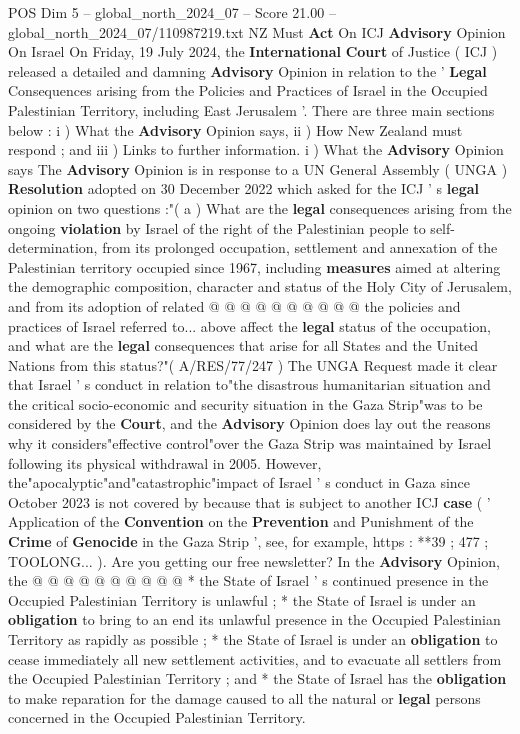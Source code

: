 \begin{textsample}{POS Dim 5 – global\_north\_2024\_07 – Score 21.00 – global\_north\_2024\_07/110987219.txt}  \label{ex:f5_pos_302}
NZ Must \textbf{Act} On ICJ \textbf{Advisory} Opinion On Israel On Friday, 19 July 2024, the \textbf{International} \textbf{Court} of Justice ( ICJ ) released a detailed and damning \textbf{Advisory} Opinion in relation to the ' \textbf{Legal} Consequences arising from the Policies and Practices of Israel in the Occupied Palestinian Territory, including East Jerusalem '.
There are three main sections below : i ) What the \textbf{Advisory} Opinion says, ii ) How New Zealand must respond ; and iii ) Links to further information. i ) What the \textbf{Advisory} Opinion says The \textbf{Advisory} Opinion is in response to a UN General Assembly ( UNGA ) \textbf{Resolution} adopted on 30 December 2022 which asked for the ICJ ' s \textbf{legal} opinion on two questions :"( a ) What are the \textbf{legal} consequences arising from the ongoing \textbf{violation} by Israel of the right of the Palestinian people to self-determination, from its prolonged occupation, settlement and annexation of the Palestinian territory occupied since 1967, including \textbf{measures} aimed at altering the demographic composition, character and status of the Holy City of Jerusalem, and from its adoption of related @ @ @ @ @ @ @ @ @ @ the policies and practices of Israel referred to... above affect the \textbf{legal} status of the occupation, and what are the \textbf{legal} consequences that arise for all States and the United Nations from this status?"( A/RES/77/247 ) The UNGA Request made it clear that Israel ' s conduct in relation to"the disastrous humanitarian situation and the critical socio-economic and security situation in the Gaza Strip"was to be considered by the \textbf{Court}, and the \textbf{Advisory} Opinion does lay out the reasons why it considers"effective control"over the Gaza Strip was maintained by Israel following its physical withdrawal in 2005.
However, the"apocalyptic"and"catastrophic"impact of Israel ' s conduct in Gaza since October 2023 is not covered by because that is subject to another ICJ \textbf{case} ( ' Application of the \textbf{Convention} on the \textbf{Prevention} and Punishment of the \textbf{Crime} of \textbf{Genocide} in the Gaza Strip ', see, for example, https : **39 ; 477 ; TOOLONG... ).
Are you getting our free newsletter?
In the \textbf{Advisory} Opinion, the @ @ @ @ @ @ @ @ @ @ * the State of Israel ' s continued presence in the Occupied Palestinian Territory is unlawful ; * the State of Israel is under an \textbf{obligation} to bring to an end its unlawful presence in the Occupied Palestinian Territory as rapidly as possible ; * the State of Israel is under an \textbf{obligation} to cease immediately all new settlement activities, and to evacuate all settlers from the Occupied Palestinian Territory ; and * the State of Israel has the \textbf{obligation} to make reparation for the damage caused to all the natural or \textbf{legal} persons concerned in the Occupied Palestinian Territory.

\end{textsample}
